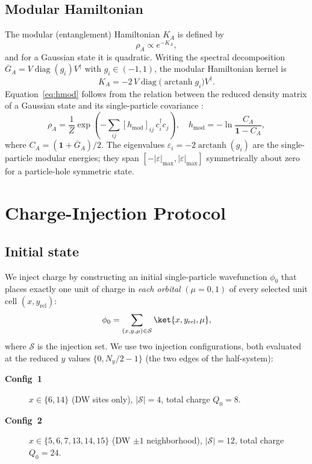 \documentclass[aps,prb,twocolumn,superscriptaddress,floatfix]{revtex4-2}
\newcommand{\Ny}{N_y}
\newcommand{\hmod}{K_A}
\DeclareMathOperator{\arctanh}{arctanh}
\begin{document}
\subsection{Modular Hamiltonian}

The modular (entanglement) Hamiltonian $\hmod$ is defined by
\begin{equation}
  \rho_A \propto e^{-\hmod},
\end{equation}
and for a Gaussian state it is quadratic.  Writing the spectral decomposition
$\overline{G}_A = V \operatorname{diag}(g_i) V^\dagger$ with
$g_i \in (-1, 1)$, the modular Hamiltonian kernel is
\begin{equation}
  \hmod = -2\, V \operatorname{diag}\!\bigl(\arctanh g_i\bigr) V^\dagger.
  \label{eq:hmod}
\end{equation}
Equation~\eqref{eq:hmod} follows from the relation between the reduced density
matrix of a Gaussian state and its single-particle covariance \cite{Peschel2003}:
\begin{equation}
  \rho_A = \frac{1}{Z}
    \exp\!\left(
      -\sum_{ij} [h_{\mathrm{mod}}]_{ij}\, c^\dagger_i c_j
    \right),
    \quad
  h_{\mathrm{mod}} = -\ln \frac{C_A}{\mathbf{1}-C_A},
\end{equation}
where $C_A = (\mathbf{1} + \overline{G}_A)/2$.  The eigenvalues $\varepsilon_i =
-2\arctanh(g_i)$ are the single-particle modular energies; they span
$[-|\varepsilon|_{\max}, |\varepsilon|_{\max}]$ symmetrically about zero for a
particle-hole symmetric state.

\section{Charge-Injection Protocol}
\label{sec:injection}

\subsection{Initial state}

We inject charge by constructing an initial single-particle wavefunction
$\phi_0$ that places exactly one unit of charge in \emph{each orbital}
$(\mu = 0, 1)$ of every selected unit cell $(x, y_\mathrm{rel})$:
\begin{equation}
  \phi_0 = \sum_{(x,y,\mu) \in \mathcal{S}} \ket{x, y_\mathrm{rel}, \mu},
\end{equation}
where $\mathcal{S}$ is the injection set.  We use two injection
configurations, both evaluated at the reduced $y$ values $\{0, \Ny/2 - 1\}$
(the two edges of the half-system):
\begin{description}
  \item[\textbf{Config~1}] $x \in \{6, 14\}$ (DW sites only),
    $|\mathcal{S}| = 4$, total charge $Q_0 = 8$.
  \item[\textbf{Config~2}] $x \in \{5, 6, 7, 13, 14, 15\}$ (DW $\pm 1$
    neighborhood), $|\mathcal{S}| = 12$, total charge $Q_0 = 24$.
\end{description}
\end{document}
